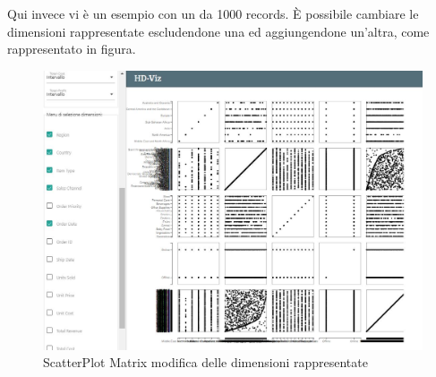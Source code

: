 \documentclass[../manuale_utente.tex]{subfiles}
\begin{document}
Qui invece vi è un esempio con un  da 1000 records. È possibile cambiare le dimensioni rappresentate escludendone una ed aggiungendone un'altra, come rappresentato in figura.

\begin{figure}[H]
	\centering
	\includegraphics[width=18cm]{src/img/spm/spm_cambio_dim.jpg}
	\caption{ScatterPlot Matrix modifica delle dimensioni rappresentate}
\end{figure}
\end{document}

